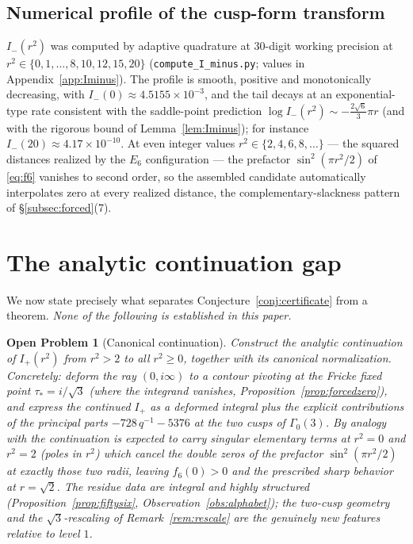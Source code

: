 \documentclass[11pt,reqno]{amsart}
\theoremstyle{plain}
\newtheorem{openproblem}[theorem]{Open Problem}
\theoremstyle{definition}
\theoremstyle{remark}
\newcommand{\Ip}{I_{+}}
\newcommand{\Imm}{I_{-}}
\begin{document}
\subsection{Numerical profile of the cusp-form transform}
\label{subsec:Iminusnum}

$\Imm(r^2)$ was computed by adaptive quadrature at $30$-digit working
precision at $r^2\in\{0,1,\dots,8,10,12,15,20\}$
(\texttt{compute\_I\_minus.py}; values in
Appendix~\ref{app:Iminus}).  The profile is smooth, positive and
monotonically decreasing, with $\Imm(0)\approx4.5155\times10^{-3}$,
and the tail decays at an exponential-type rate consistent with the
saddle-point prediction
$\log \Imm(r^2)\sim-\tfrac{2\sqrt6}{3}\pi r$ (and with the rigorous
bound of Lemma~\ref{lem:Iminus}); for instance
$\Imm(20)\approx4.17\times10^{-10}$.  At even integer values
$r^2\in\{2,4,6,8,\dots\}$ --- the squared distances realized by the
$E_6$ configuration --- the prefactor $\sin^2(\pi r^2/2)$ of
\eqref{eq:f6} vanishes to second order, so the assembled candidate
automatically interpolates zero at every realized distance, the
complementary-slackness pattern of \S\ref{subsec:forced}(7).

\section{The analytic continuation gap}\label{sec:gap}

We now state precisely what separates
Conjecture~\ref{conj:certificate} from a theorem.  \emph{None of the
following is established in this paper.}

\begin{openproblem}[Canonical continuation]\label{op:continuation}
Construct the analytic continuation of $\Ip(r^2)$ from $r^2>2$ to all
$r^2\ge0$, together with its canonical normalization.  Concretely:
deform the ray $(0,i\infty)$ to a contour pivoting at the Fricke fixed
point $\tau_*=i/\sqrt3$ (where the integrand vanishes,
Proposition~\ref{prop:forcedzero}), and express the continued
$\Ip$ as a deformed integral plus the explicit contributions of the
principal parts $-728\,q^{-1}-5376$ at the two cusps of
$\Gamma_0(3)$.  By analogy with \cite[\S7]{Viazovska2017} the
continuation is expected to carry singular elementary terms at
$r^2=0$ and $r^2=2$ (poles in $r^2$) which cancel the double zeros of
the prefactor $\sin^2(\pi r^2/2)$ at exactly those two radii, leaving
$f_6(0)>0$ and the prescribed sharp behavior at $r=\sqrt2$.  The
residue data are integral and highly structured
(Proposition~\ref{prop:fiftysix}, Observation~\ref{obs:alphabet});
the two-cusp geometry and the $\sqrt3$-rescaling of
Remark~\ref{rem:rescale} are the genuinely new features relative to
level $1$.
\end{openproblem}
\end{document}

